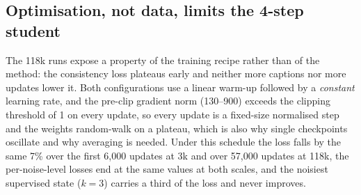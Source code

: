 \documentclass{article} %
\newcommand{\fitbox}[1]{\resizebox{\ifdim\width>\linewidth\linewidth\else\width\fi}{!}{#1}}
\begin{document}
\begin{table}[t]
\centering
\caption{118k captions, 56,974 updates, three training seeds, last-five-checkpoint averages, 4 steps,
$w{=}1$. Seed-paired contrasts as in Table~\ref{tab:main}; the prompt-level $p$ is a paired $t$-test over
the 2,398 CompBench (800 GenEval2) prompts after averaging each prompt's score over the three seeds.}
\label{tab:scale}
\fitbox{}
\end{table}

\begin{table}[t]
\centering
\caption{CompBench by category at 118k, three seeds, last-five-checkpoint averages, one image per prompt.}
\label{tab:scale_cat}
\fitbox{}
\end{table}

\subsection{Optimisation, not data, limits the 4-step student}
\label{sec:results-schedule}
The 118k runs expose a property of the training recipe rather than of the method: the consistency loss
plateaus early and neither more captions nor more updates lower it. Both configurations use a linear
warm-up followed by a \emph{constant} learning rate, and the pre-clip gradient norm (130--900) exceeds
the clipping threshold of 1 on every update, so every update is a fixed-size normalised step and the
weights random-walk on a plateau, which is also why single checkpoints oscillate and why averaging is
needed. Under this schedule the loss falls by the same 7\% over the first 6,000 updates at 3k and over
57,000 updates at 118k, the per-noise-level losses end at the same values at both scales, and the
noisiest supervised state ($k{=}3$) carries a third of the loss and never improves.
\end{document}
